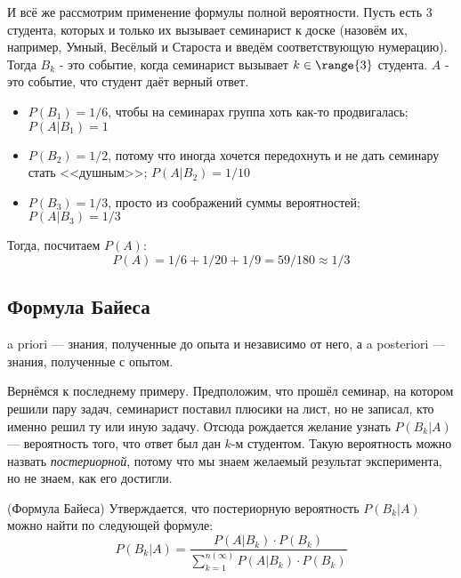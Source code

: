 \begin{example}
	И всё же рассмотрим применение формулы полной вероятности. Пусть есть 3 студента, которых и только их вызывает семинарист к доске (назовём их, например, Умный, Весёлый и Староста и введём соответствующую нумерацию). Тогда $B_k$ - это событие, когда семинарист вызывает $k \in \range{3}$ студента. $A$ - это событие, что студент даёт верный ответ.
	\begin{itemize}
		\item $P(B_1) = 1/6$, чтобы на семинарах группа хоть как-то продвигалась; $P(A | B_1) = 1$
		
		\item $P(B_2) = 1/2$, потому что иногда хочется передохнуть и не дать семинару стать <<душным>>; $P(A | B_2) = 1 / 10$
		
		\item $P(B_3) = 1/3$, просто из соображений суммы вероятностей; $P(A | B_3) = 1 / 3$
	\end{itemize}
	Тогда, посчитаем $P(A)$:
	\[
		P(A) = 1 / 6 + 1 / 20 + 1 / 9 = 59 / 180 \approx 1 / 3
	\]
\end{example}

\subsection{Формула Байеса}

\begin{note}
	a priori --- знания, полученные до опыта и независимо от него, а a posteriori --- знания, полученные с опытом.
\end{note}

\begin{example}
	Вернёмся к последнему примеру. Предположим, что прошёл семинар, на котором решили пару задач, семинарист поставил плюсики на лист, но не записал, кто именно решил ту или иную задачу. Отсюда рождается желание узнать $P(B_k | A)$ --- вероятность того, что ответ был дан $k$-м студентом. Такую вероятность можно назвать \textit{постериорной}, потому что мы знаем желаемый результат эксперимента, но не знаем, как его достигли.
\end{example}

\begin{theorem} (Формула Байеса)
	Утверждается, что постериорную вероятность $P(B_k | A)$ можно найти по следующей формуле:
	\[
		P(B_k | A) = \frac{P(A | B_k) \cdot P(B_k)}{\sum_{k = 1}^{n(\infty)} P(A | B_k) \cdot P(B_k)}
	\]
\end{theorem}

